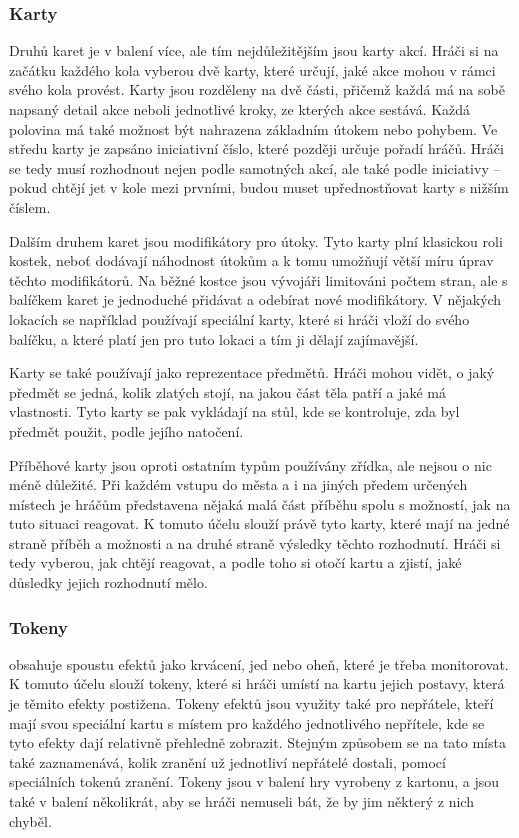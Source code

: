 \subsubsection*{Karty}
\label{subsubsec:gh_comp_cards}

Druhů karet je v balení více, ale tím nejdůležitějším jsou karty akcí. Hráči si na začátku každého kola vyberou dvě karty, které určují, jaké akce mohou v rámci svého kola provést. Karty jsou rozděleny na dvě části, přičemž každá má na sobě napsaný detail akce neboli jednotlivé kroky, ze kterých akce sestává. Každá polovina má také možnost být nahrazena základním útokem nebo pohybem. Ve středu karty je zapsáno iniciativní číslo, které později určuje pořadí hráčů. Hráči se tedy musí rozhodnout nejen podle samotných akcí, ale také podle iniciativy -- pokud chtějí jet v kole mezi prvními, budou muset upřednostňovat karty s nižším číslem.

Dalším druhem karet jsou modifikátory pro útoky. Tyto karty plní klasickou roli kostek, neboť dodávají náhodnost útokům a k tomu umožňují větší míru úprav těchto modifikátorů. Na běžné kostce jsou vývojáři limitováni počtem stran, ale s balíčkem karet je jednoduché přidávat a odebírat nové modifikátory. V nějakých lokacích se například používají speciální karty, které si hráči vloží do svého balíčku, a které platí jen pro tuto lokaci a tím ji dělají zajímavější.

Karty se také používají jako reprezentace předmětů. Hráči mohou vidět, o jaký předmět se jedná, kolik zlatých stojí, na jakou část těla patří a jaké má vlastnosti. Tyto karty se pak vykládají na stůl, kde se kontroluje, zda byl předmět použit, podle jejího natočení.

Příběhové karty jsou oproti ostatním typům používány zřídka, ale nejsou o nic méně důležité. Při každém vstupu do města a i na jiných předem určených místech je hráčům představena nějaká malá část příběhu spolu s možností, jak na tuto situaci reagovat. K tomuto účelu slouží právě tyto karty, které mají na jedné straně příběh a možnosti a na druhé straně výsledky těchto rozhodnutí. Hráči si tedy vyberou, jak chtějí reagovat, a podle toho si otočí kartu a zjistí, jaké důsledky jejich rozhodnutí mělo.

\subsubsection*{Tokeny}
\label{subsubsec:gh_comp_tokens}

 obsahuje spoustu efektů jako krvácení, jed nebo oheň, které je třeba monitorovat. K tomuto účelu slouží tokeny, které si hráči umístí na kartu jejich postavy, která je těmito efekty postižena. Tokeny efektů jsou využity také pro nepřátele, kteří mají svou speciální kartu s místem pro každého jednotlivého nepřítele, kde se tyto efekty dají relativně přehledně zobrazit. Stejným způsobem se na tato místa také zaznamenává, kolik zranění už jednotliví nepřátelé dostali, pomocí speciálních tokenů zranění. Tokeny jsou v balení hry vyrobeny z kartonu, a jsou také v balení několikrát, aby se hráči nemuseli bát, že by jim některý z nich chyběl.

